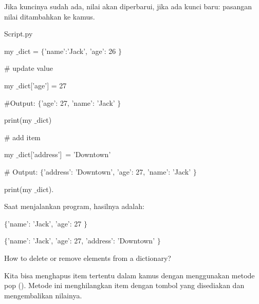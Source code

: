\noindent 
Jika kuncinya sudah ada, nilai akan diperbarui, jika ada kunci baru: pasangan nilai ditambahkan ke kamus. \par
\noindent 
Script.py \par
\noindent 
 \hspace*{0.5in} my $  \_  $dict =  $  \{  $'name':'Jack', 'age': 26 $  \}  $ \par
\vspace{12pt}
\noindent 
 \hspace*{0.5in}  $  \#  $ update value \par
\noindent 
 \hspace*{0.5in} my $  \_  $dict['age'] = 27 \par
\vspace{12pt}
\noindent 
 \hspace*{0.5in}  $  \#  $Output:  $  \{  $'age': 27, 'name': 'Jack' $  \}  $ \par
\noindent 
 \hspace*{0.5in} print(my $  \_  $dict) \par
\vspace{12pt}
\noindent 
 \hspace*{0.5in}  $  \#  $ add item \par
\noindent 
 \hspace*{0.5in} my $  \_  $dict['address']~= 'Downtown'   \par
\vspace{12pt}
\noindent 
 \hspace*{0.5in}  $  \#  $ Output:  $  \{  $'address': 'Downtown', 'age': 27, 'name': 'Jack' $  \}  $ \par
\noindent 
 \hspace*{0.5in} print(my $  \_  $dict). \par
\vspace{12pt}
\noindent 
Saat menjalankan program, hasilnya adalah: \par
\noindent 
 $  \{  $'name': 'Jack', 'age': 27 $  \}  $ \par
\noindent 
 $  \{  $'name': 'Jack', 'age': 27, 'address': 'Downtown' $  \}  $ \par
\vspace{12pt}
\noindent 
How to delete or remove elements from a dictionary? \par
\noindent 
Kita bisa menghapus item tertentu dalam kamus dengan menggunakan metode pop (). Metode ini menghilangkan item dengan tombol yang disediakan dan mengembalikan nilainya. \par
\noindent 
